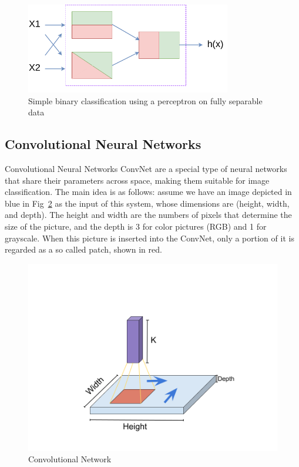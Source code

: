 \begin{figure}[!htb]
    \centering
      \includegraphics[width=0.8\textwidth]{figures/neuralnetwork}
      \caption{Simple binary classification using a perceptron on fully separable data}
      \label{fig:neuralnetwork}
\end{figure}

\subsection{Convolutional Neural Networks}

Convolutional Neural Networks \ac{ConvNet} are a special type of neural networks that share their parameters across space, making them suitable for image classification. The main idea is as follows: assume we have an image depicted in blue in Fig~\ref{fig:convolutionalnetwork} as the input of this system, whose dimensions are (height, width, and depth). The height and width are the numbers of pixels that determine the size of the picture, and the depth is 3 for color pictures (RGB) and 1 for grayscale. When this picture is inserted into the \ac{ConvNet}, only a portion of it is regarded as a so called patch, shown in red.

\begin{figure}[!t]
    \centering
      \includegraphics[width=\textwidth]{figures/convolutionalnetwork}
      \caption{Convolutional Network}
      \label{fig:convolutionalnetwork}
\end{figure}

